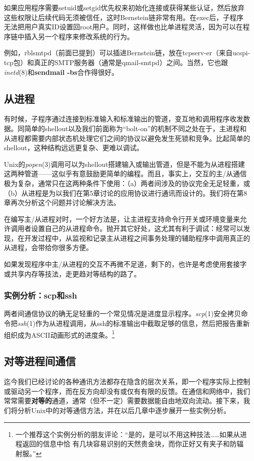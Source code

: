\documentclass[12pt,oneside]{book}
\begin{document}
如果应用程序需要setuid或setgid优先权来初始化连接或获得某些认证，然后放弃这些权限让后续代码无须被信任，这时Bernstein链非常有用。在exec后，子程序无法把用户真实ID设置回root用户。同时，这样做也比单进程灵活，因为可以在程序链中插入另一个程序来修改系统的行为。

例如，rblsmtpd（前面已提到）可以插进Bernstein链，放在tcpserv-er（来自ucspi-tcp包）和真正的SMTP服务器（通常是qmail-smtpd）之间。当然，它也跟\textit{inetd}(8)和\textbf{sendmail -bs}合作得很好。


\subsection{从进程}
有时候，子程序通过连接到标准输入和标准输出的管道，变互地和调用程序收发数据。同简单的shellout以及我们前面称为“bolt-on”的机制不同之处在于，主进程和从进程都需要内部状态机处理它们之间的协议以避免发生死锁和竞争。比起简单的shellout，这种结构远远更复杂、更难以调试。

Unix的\textit{popen}(3)调用可以为shellout搭建输入或输出管道，但是不能为从进程搭建这两种管道——这似乎有意鼓励更简单的编程。而且，事实上，交互的主/从通信极为复杂，通常只在这两种条件下使用：（a）两者间涉及的协议完全无足轻重，或（b）从进程是为以我们在第5章讨论的应用协议进行通讯而设计的。我们将在第8章再次分析这个问题并讨论解决方法。

在编写主/从进程对时，一个好方法是，让主进程支持命令行开关或环境变量来允许调用者设置自己的从进程命令。抛开其它好处，这尤其有利于调试：经常可以发现，在开发过程中，从监视和记录主从进程之间事务处理的辅助程序中调用真正的从进程，会带给你很多方便。

如果发现程序中主/从进程的交互不再微不足道，剩下的，也许是考虑使用套接字或共享内存等技法，走更趋对等结构的路了。


\subsubsection{实例分析：scp和ssh}
两者间通信协议的确无足轻重的一个常见情况是进度显示程序。\textit{scp}(1)安全拷贝命令把\textit{ssh}(1)作为从进程调用，从ssh的标准输出中截取足够的信息，然后把报告重新组织成为ASCII动画形式的进度条。\footnote{一个推荐这个实例分析的朋友评论：“是的，是可以不用这种技法……如果从进程返回的信息中恰
有几块容易识别的天然贵金块，而你正好又有夹子和防辐射服。”}


\subsection{对等进程间通信}
迄今我们已经讨论的各种通讯方法都存在隐含的层次关系，即一个程序实际上控制或驱动另一个程序，而在反方向却没有或仅有有限的反馈。在通信和网络中，我们常常需要\textbf{对等的}通道，通常（但不一定）需要数据能自由地双向流动。接下来，我们将分析Unix中的对等通信方法，并在以后几章中逐步展开一些实例分析。
\end{document}
